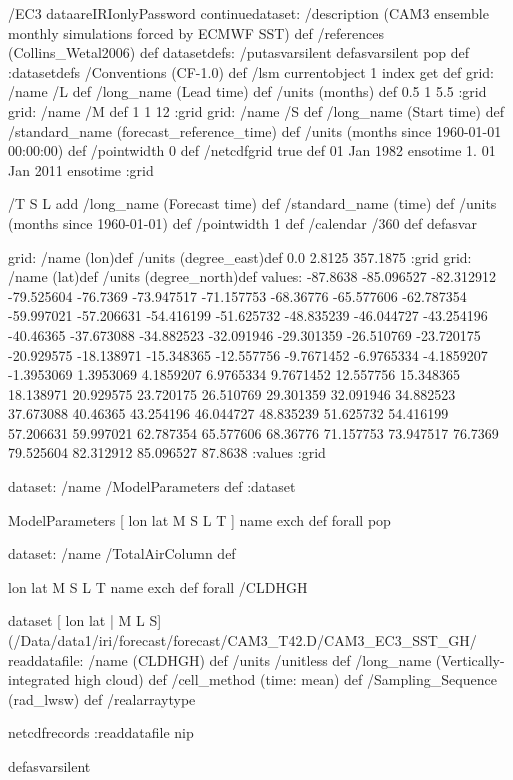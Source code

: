 

\begin{ingrid}
/EC3 dataareIRIonlyPassword
continuedataset:
/description (CAM3 ensemble monthly simulations forced by ECMWF SST) def
/references (Collins_Wetal2006) def
datasetdefs:
/putasvarsilent { defasvarsilent pop } def
:datasetdefs
/Conventions (CF-1.0) def
/lsm currentobject 1 index get def
grid:
/name /L def
/long_name (Lead time) def
/units (months) def
0.5 1 5.5
:grid
grid:
/name /M def
1 1 12
:grid
grid:
/name /S def
/long_name (Start time) def
/standard_name (forecast_reference_time) def
/units (months since 1960-01-01 00:00:00) def
/pointwidth 0 def 
/netcdfgrid true def
01 Jan 1982 ensotime
1.
01 Jan 2011 ensotime
:grid

/T { 
S L add
/long_name (Forecast time) def
/standard_name (time) def
/units (months since 1960-01-01) def
/pointwidth 1 def
/calendar /360 def
 }defasvar



grid:
/name (lon)def
/units (degree_east)def
 0.0 2.8125 357.1875
:grid
grid:
/name (lat)def
/units (degree_north)def
values: -87.8638 -85.096527 -82.312912 -79.525604 -76.7369 -73.947517 -71.157753 -68.36776 -65.577606 -62.787354 -59.997021 -57.206631 -54.416199 -51.625732 -48.835239 -46.044727 -43.254196 -40.46365 -37.673088 -34.882523 -32.091946 -29.301359 -26.510769 -23.720175 -20.929575 -18.138971 -15.348365 -12.557756 -9.7671452 -6.9765334 -4.1859207 -1.3953069 1.3953069 4.1859207 6.9765334 9.7671452 12.557756 15.348365 18.138971 20.929575 23.720175 26.510769 29.301359 32.091946 34.882523 37.673088 40.46365 43.254196 46.044727 48.835239 51.625732 54.416199 57.206631 59.997021 62.787354 65.577606 68.36776 71.157753 73.947517 76.7369 79.525604 82.312912 85.096527 87.8638 :values
:grid

dataset: /name /ModelParameters def :dataset

ModelParameters  [ lon lat M S L T ] { name exch def } forall pop

dataset: /name /TotalAirColumn def

 { lon lat M S L T } { name exch def } forall 
 /CLDHGH {
dataset
[ lon lat | M L S] 
(/Data/data1/iri/forecast/forecast/CAM3_T42.D/CAM3_EC3_SST_GH/%
readdatafile:
/name (CLDHGH) def
/units /unitless def
/long_name (Vertically-integrated high cloud) def
/cell_method (time: mean) def
/Sampling_Sequence (rad_lwsw) def
/realarraytype 

netcdfrecords 
:readdatafile
nip
}defasvarsilent


\end{ingrid}
